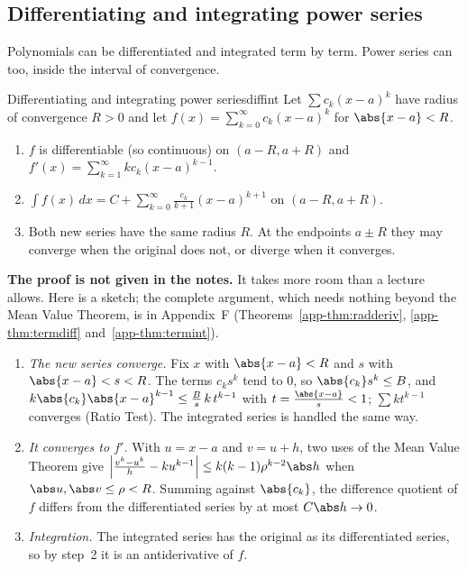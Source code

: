\documentclass[11pt]{article}
\begin{document}
\subsection*{Differentiating and integrating power series}

Polynomials can be differentiated and integrated term by term. Power series can too, inside the interval of convergence.

\begin{thm}{Differentiating and integrating power series}{diffint}
Let $\sum c_k(x-a)^k$ have radius of convergence $R>0$ and let $f(x)=\sum_{k=0}^\infty c_k(x-a)^k$ for $\abs{x-a}<R$.
\begin{enumerate}
  \item $f$ is differentiable (so continuous) on $(a-R,a+R)$ and $f'(x)=\sum_{k=1}^\infty kc_k(x-a)^{k-1}$.
  \item $\displaystyle\int f(x)\,dx=C+\sum_{k=0}^\infty\frac{c_k}{k+1}(x-a)^{k+1}$ on $(a-R,a+R)$.
  \item Both new series have the same radius $R$. At the endpoints $a\pm R$ they may converge when the original does not, or diverge when it converges.
\end{enumerate}
\end{thm}
\textbf{The proof is not given in the notes.} It takes more room than a lecture allows. Here is a sketch; the complete argument, which needs nothing beyond the Mean Value Theorem, is in Appendix~F (Theorems~\ref{app-thm:radderiv}, \ref{app-thm:termdiff} and~\ref{app-thm:termint}).
\begin{enumerate}[nosep]
  \item \emph{The new series converge.} Fix $x$ with $\abs{x-a}<R$ and $s$ with $\abs{x-a}<s<R$. The terms $c_ks^k$ tend to $0$, so $\abs{c_k}s^k\le B$, and $k\abs{c_k}\abs{x-a}^{k-1}\le\frac Bs\,k\,t^{k-1}$ with $t=\frac{\abs{x-a}}s<1$; $\sum kt^{k-1}$ converges (Ratio Test). The integrated series is handled the same way.
  \item \emph{It converges to $f'$.} With $u=x-a$ and $v=u+h$, two uses of the Mean Value Theorem give $\left|\frac{v^k-u^k}h-ku^{k-1}\right|\le k(k-1)\rho^{k-2}\abs h$ when $\abs u,\abs v\le\rho<R$. Summing against $\abs{c_k}$, the difference quotient of $f$ differs from the differentiated series by at most $C\abs h\to0$.
  \item \emph{Integration.} The integrated series has the original as its differentiated series, so by step~2 it is an antiderivative of $f$.
\end{enumerate}
\end{document}
